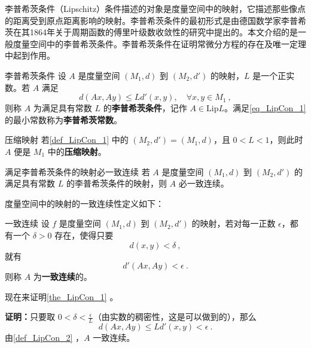 
李普希茨条件（Lipschitz）条件描述的对象是度量空间中的映射，它描述那些像点的距离受到原点距离影响的映射。李普希茨条件的最初形式是由德国数学家李普希茨在其1864年关于周期函数的傅里叶级数收敛性的研究中提出的\cite{Li}。本文介绍的是一般度量空间中的李普希茨条件。李普希茨条件在证明常微分方程的存在及唯一定理中起到作用。
\begin{definition}{李普希茨条件}\label{def_LipCon_1}
设 $A$ 是度量空间 $(M_1,d)$ 到 $(M_2,d')$ 的映射，$L$ 是一个正实数。若 $A$ 满足
\begin{equation}\label{eq_LipCon_1}
d(Ax,Ay)\leq Ld'(x,y),\quad\forall x,y\in M_1~,
\end{equation}
则称 $A$ 为满足具有常数 $L$ 的\textbf{李普希茨条件}，记作 $A\in \mathrm{Lip} L$。满足\autoref{eq_LipCon_1} 的最小常数称为\textbf{李普希茨常数}。
\end{definition}
\begin{example}{压缩映射}
若\autoref{def_LipCon_1} 中的 $(M_2,d')=(M_1,d)$，且 $0<L<1$，则此时 $A$ 便是 $M_1$ 中的\textbf{压缩映射}。
\end{example}

\begin{theorem}{满足李普希茨条件的映射必一致连续}\label{the_LipCon_1}
若 $A$ 是度量空间 $(M_1,d)$ 到 $(M_2,d')$ 的满足具有常数 $L$ 的李普希茨条件的映射，则 $A$ 必一致连续。
\end{theorem}
度量空间中的映射的一致连续性定义如下：
\begin{definition}{一致连续}\label{def_LipCon_2}
设 $f$ 是度量空间 $(M_1,d)$ 到 $(M_2,d')$ 的映射，若对每一正数 $\epsilon$，都有一个 $\delta>0$ 存在，使得只要
\begin{equation}
d(x,y)<\delta~,
\end{equation}
就有
\begin{equation}
d'(Ax,Ay)<\epsilon~.
\end{equation}
则称 $A$ 为\textbf{一致连续}的。

\end{definition}
现在来证明\autoref{the_LipCon_1} 。

\textbf{证明：}只要取 $0<\delta<\frac{\epsilon}{L}$（由实数的稠密性，这是可以做到的），那么
\begin{equation}
d(Ax,Ay)\leq Ld'(x,y)< \epsilon~.
\end{equation}
由\autoref{def_LipCon_2} ，$A$ 一致连续。

